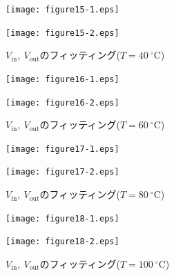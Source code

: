 \documentclass[a4paper,10.5pt]{ltjsarticle}
\begin{document}
\begin{figure}[htbp]
  \begin{minipage}[h]{0.50\linewidth}
    \centering
    \texttt{[image: figure15-1.eps]}
  \end{minipage}
  \begin{minipage}[h]{0.50\linewidth}
    \centering
    \texttt{[image: figure15-2.eps]}
  \end{minipage}
  \caption{$V_\mathrm{in},\ V_\mathrm{out}$のフィッティング($T=40\ ^\circ \mathrm{C}$)}
\end{figure}
\clearpage
\begin{figure}[b]
  \begin{minipage}[h]{0.50\linewidth}
    \centering
    \texttt{[image: figure16-1.eps]}
  \end{minipage}
  \begin{minipage}[h]{0.50\linewidth}
    \centering
    \texttt{[image: figure16-2.eps]}
  \end{minipage}
  \caption{$V_\mathrm{in},\ V_\mathrm{out}$のフィッティング($T=60\ ^\circ \mathrm{C}$)}
\end{figure}

\begin{figure}[b]
  \begin{minipage}[h]{0.50\linewidth}
    \centering
    \texttt{[image: figure17-1.eps]}
  \end{minipage}
  \begin{minipage}[h]{0.50\linewidth}
    \centering
    \texttt{[image: figure17-2.eps]}
  \end{minipage}
  \caption{$V_\mathrm{in},\ V_\mathrm{out}$のフィッティング($T=80\ ^\circ \mathrm{C}$)}
\end{figure}

\begin{figure}[b]
  \begin{minipage}[h]{0.50\linewidth}
    \centering
    \texttt{[image: figure18-1.eps]}
  \end{minipage}
  \begin{minipage}[h]{0.50\linewidth}
    \centering
    \texttt{[image: figure18-2.eps]}
  \end{minipage}
  \caption{$V_\mathrm{in},\ V_\mathrm{out}$のフィッティング($T=100\ ^\circ \mathrm{C}$)}
\end{figure}
\end{document}

